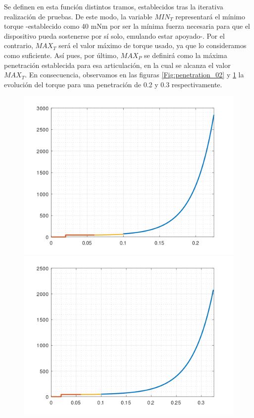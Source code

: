 Se definen en esta función distintos tramos, establecidos tras la iterativa realización de pruebas. De este modo, la variable $MIN_T$ representará el mínimo torque -establecido como 40 mNm por ser la mínima fuerza necesaria para que el dispositivo pueda sostenerse por sí solo, emulando estar apoyado-. Por el contrario, $MAX_T$ será el valor máximo de torque usado, ya que lo consideramos como suficiente. Así pues, por último, $MAX_P$ se definirá como la máxima penetración establecida para esa articulación, en la cual se alcanza el valor $MAX_T$. En consecuencia, observamos en las figuras \ref{Fig:penetration_02} y \ref{Fig:penetration_03} la evolución del torque para una penetración de 0.2 y 0.3 respectivamente.

\begin{figure}[!htb]
   \begin{minipage}{0.45\textwidth}
     \centering
    \includegraphics[width=1\textwidth]{imagenes/forceEvolution0.2penetration.png}
    \caption{}
    \label{Fig:penetration_02}
   \end{minipage}\hfill
   \begin{minipage}{0.45\textwidth}
     \centering
    \includegraphics[width=1\textwidth]{imagenes/forceEvolution0.3penetration.png}
    \caption{}
    \label{Fig:penetration_03}
   \end{minipage}
\end{figure}

